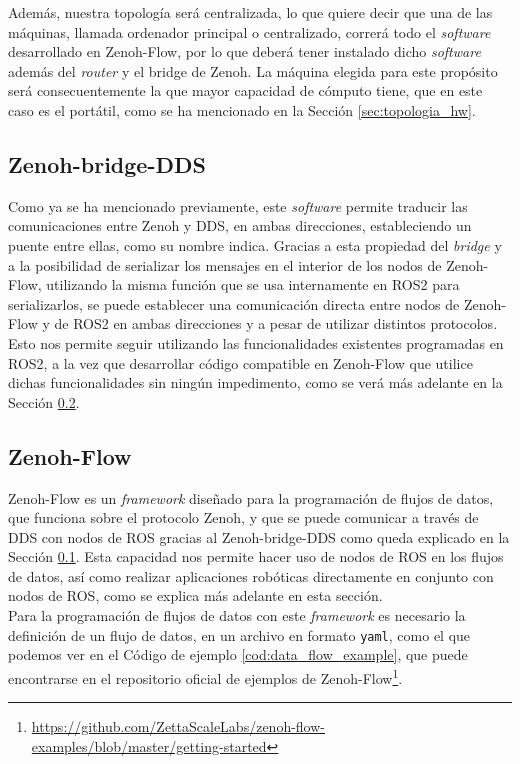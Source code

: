 Además, nuestra topología será centralizada, lo que quiere decir que una de las
máquinas, llamada ordenador principal o centralizado, correrá todo el
\textit{software} desarrollado en Zenoh-Flow, por lo que deberá tener instalado
dicho \textit{software} además del \textit{router} y el bridge de Zenoh.
La máquina elegida para este propósito será consecuentemente la que mayor
capacidad de cómputo tiene, que en este caso es el portátil, como se ha
mencionado en la Sección \ref{sec:topologia_hw}.


\subsection{Zenoh-bridge-DDS}
\label{sec:zenoh_bridge}

Como ya se ha mencionado previamente, este \textit{software} permite traducir
las comunicaciones entre Zenoh y DDS, en ambas direcciones, estableciendo un
puente entre ellas, como su nombre indica.
Gracias a esta propiedad del \textit{bridge} y a la posibilidad de serializar
los mensajes en el interior de los nodos de Zenoh-Flow, utilizando la misma
función que se usa internamente en ROS2 para serializarlos, se puede establecer
una comunicación directa entre nodos de Zenoh-Flow y de ROS2 en ambas
direcciones y a pesar de utilizar distintos protocolos.
\\

Esto nos permite seguir utilizando las funcionalidades existentes programadas
en ROS2, a la vez que desarrollar código compatible en Zenoh-Flow que utilice
dichas funcionalidades sin ningún impedimento, como se verá más adelante en la
Sección \ref{sec:zenoh_flow}.
\\


\subsection{Zenoh-Flow}
\label{sec:zenoh_flow}

Zenoh-Flow es un \textit{framework} diseñado para la programación de flujos de
datos, que funciona sobre el protocolo Zenoh, y que se puede comunicar a través
de DDS con nodos de ROS gracias al Zenoh-bridge-DDS como queda explicado en la
Sección \ref{sec:zenoh_bridge}.
Esta capacidad nos permite hacer uso de nodos de ROS en los flujos de datos, así
como realizar aplicaciones robóticas directamente en conjunto con nodos de ROS,
como se explica más adelante en esta sección.
\\

Para la programación de flujos de datos con este \textit{framework} es necesario
la definición de un flujo de datos, en un archivo en formato \texttt{yaml}, como
el que podemos ver en el Código de ejemplo \ref{cod:data_flow_example}, que
puede encontrarse en el repositorio oficial de ejemplos de Zenoh-Flow\footnote{
\url{https://github.com/ZettaScaleLabs/zenoh-flow-examples/blob/master/getting-started}}.
\\

